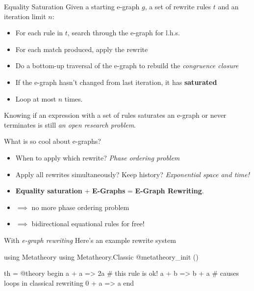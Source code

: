 \documentclass[8pt]{beamer}  %
\begin{document}
\begin{frame}{Equality Saturation}
    Given a starting e-graph $g$, a set of rewrite rules $t$ and an iteration limit $n$:
    \begin{itemize}
        \item For each rule in $t$, search through the e-graph for l.h.s.
        \item For each match produced, apply the rewrite
        \item Do a bottom-up traversal of the e-graph to rebuild the \textit{congruence closure} 
        \item If the e-graph hasn't changed from last iteration, it has \textbf{saturated}
        \item Loop at most $n$ times. 
    \end{itemize}
    
    Knowing if an expression with a set of rules saturates an e-graph or never terminates is still \textit{an open research problem}.
    
\end{frame}









\begin{frame}[fragile]{What is so cool about e-graphs?}   %

\begin{itemize}
    \item When to apply which rewrite? \textit{Phase ordering problem}
    \item Apply all rewrites simultaneously? Keep history? \textit{Exponential space and time!}
    \item \textbf{Equality saturation} + \textbf{E-Graphs} = \textbf{E-Graph Rewriting}.
    \item $\implies$ no more phase ordering problem 
    \item $\implies$ bidirectional equational rules for free! 
\end{itemize}


With \textit{e-graph rewriting}  Here's an example rewrite system


\begin{jllisting}
using Metatheory
using Metatheory.Classic
@metatheory_init ()

th = @theory begin
    a + a => 2a     # this rule is ok! 
    a + b => b + a  # causes loops in classical rewriting
    0 + a => a
end 

\end{jllisting}


\end{frame}
\end{document}
